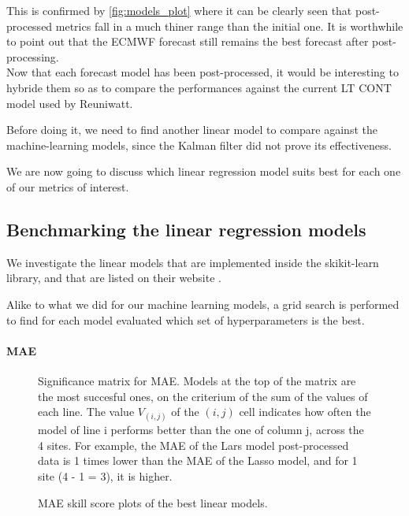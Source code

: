 This is confirmed by \autoref{fig:models_plot} where it can be clearly seen that post-processed metrics fall in a much thiner range than the initial one. It is worthwhile to point out that the ECMWF forecast still remains the best forecast after post-processing.\\

Now that each forecast model has been post-processed, it would be interesting to hybride them so as to compare the performances against the current LT CONT model used by Reuniwatt.

Before doing it, we need to find another linear model to compare against the machine-learning models, since the Kalman filter did not prove its effectiveness.

We are now going to discuss which linear regression model suits best for each one of our metrics of interest.
\subsection{Benchmarking the linear regression models}

We investigate the linear models that are implemented inside the skikit-learn library, and that are listed on their website \cite{sklearnlinear}.

Alike to what we did for our machine learning models, a grid search is performed to find for each model evaluated which set of hyperparameters is the best.
\paragraph{MAE}

\begin{figure}[htb!]
    \centering
    
\caption{Significance matrix for MAE. Models at the top of the matrix are the most succesful ones, on the criterium of the sum of the values of each line. The value $V_{(i,j)}$ of the $(i,j)$ cell indicates how often the model of line i performs better than the one of column j, across the 
4 sites. For example, the MAE of the Lars model post-processed data is 1 times lower than the MAE of the Lasso model, and for 1 site (4 - 1 = 3), it is higher.}
\label{fig:mat_linear_mae}
\end{figure}

\begin{figure}[htb!]
    \centering
    
\caption{MAE skill score plots of the best linear models.}
\label{fig:ss_linear_mae}
\end{figure}

